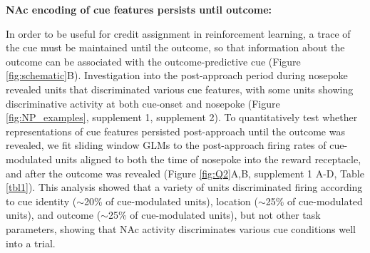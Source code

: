 \documentclass[11pt]{article}
\begin{document}
{\bf NAc encoding of cue features persists until outcome:}

In order to be useful for credit assignment in reinforcement learning, a trace of the cue must be maintained until the outcome, so that information about the outcome can be associated with the outcome-predictive cue (Figure \ref{fig:schematic}B). Investigation into the post-approach period during nosepoke revealed units that discriminated various cue features, with some units showing discriminative activity at both cue-onset and nosepoke (Figure \ref{fig:NP_examples}, supplement 1, supplement 2). To quantitatively test whether representations of cue features persisted post-approach until the outcome was revealed, we fit sliding window GLMs to the post-approach firing rates of cue-modulated units aligned to both the time of nosepoke into the reward receptacle, and after the outcome was revealed (Figure \ref{fig:Q2}A,B, supplement 1 A-D, Table \ref{tbl1}). This analysis showed that a variety of units discriminated firing according to cue identity ($\sim$20\% of cue-modulated units), location ($\sim$25\% of cue-modulated units), and outcome ($\sim$25\% of cue-modulated units), but not other task parameters, showing that NAc activity discriminates various cue conditions well into a trial.
\end{document}
